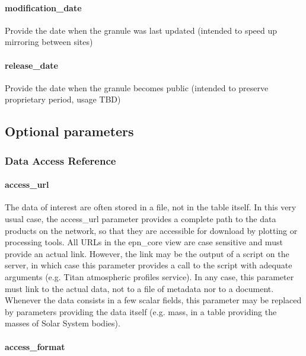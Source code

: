 \documentclass[11pt,a4paper]{ivoa}
\begin{document}
\paragraph{modification\_date}

Provide the date when the granule was last updated (intended to speed up mirroring between sites)

\paragraph{release\_date}

Provide the date when the granule becomes public (intended to preserve proprietary period, usage TBD)

\subsection{Optional parameters}

\subsubsection{Data Access Reference}

\paragraph{access\_url}

The data of interest are often stored in a file, not in the table itself. In this very usual case, the access\_url parameter provides a complete path to the data products on the network, so that they are accessible for download by plotting or processing tools. All URLs in the epn\_core view are case sensitive and must provide an actual link. However, the link may be the output of a script on the server, in which case this parameter provides a call to the script with adequate arguments (e.g. Titan atmospheric profiles service). In any case, this parameter must link to the actual data, not to a file of metadata nor to a document.\\ Whenever the data consists in a few scalar fields, this parameter may be replaced by parameters providing the data itself (e.g. mass, in a table providing the masses of Solar System bodies).

\paragraph{access\_format}
\end{document}
